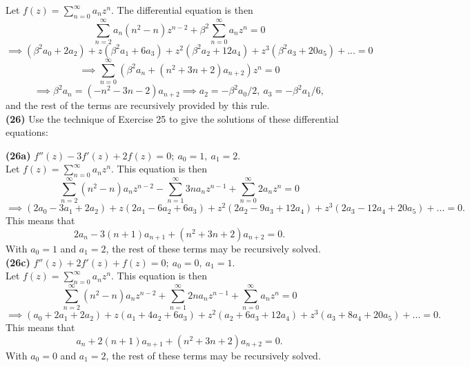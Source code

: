 \documentclass[12pt,letterpaper]{article}
\begin{document}
Let \(f(z) = \sum_{n=0}^{\infty} a_{n}z^{n}\). The differential equation is then \[\sum_{n=2}^{\infty} a_{n}(n^{2} -n)z^{n-2} +\beta^{2}\sum_{n=0}^{\infty} a_{n}z^{n} = 0\] \[\implies (\beta^{2}a_{0} + 2a_{2}) + z(\beta^{2}a_{1} + 6a_{3}) + z^{2}(\beta^{2}a_{2} + 12a_{4}) + z^{3}(\beta^{2}a_{3} + 20a_{5}) + ... = 0 \] \[\implies \sum_{n = 0}^{\infty} (\beta^{2}a_{n} + (n^{2} + 3n + 2)a_{n+2})z^{n} = 0\] \[\implies \beta^{2}a_{n} = (-n^{2} - 3n - 2)a_{n+2} \implies a_{2} = -\beta^{2}a_{0}/2,\ a_{3} = -\beta^{2}a_{1}/6,\] and the rest of the terms are recursively provided by this rule. \\

\textbf{(26)} Use the technique of Exercise 25 to give the solutions of these differential equations:

\textbf{(26a)} \(f''(z) -3f'(z) +2f(z) = 0;\ a_{0} = 1,\ a_{1} = 2.\) \\

Let \(f(z) = \sum_{n=0}^{\infty} a_{n}z^{n}\). This equation is then \[\sum_{n=2}^{\infty} (n^{2}-n)a_{n}z^{n-2} - \sum_{n=1}^{\infty} 3na_{n}z^{n-1} + \sum_{n=0}^{\infty}2a_{n}z^{n} = 0\] \[\implies (2a_{0}-3a_{1}+2a_{2})+z(2a_{1} -6a_{2} + 6a_{3})+z^{2}(2a_{2} - 9a_{3} + 12a_{4})+z^{3}(2a_{3} - 12a_{4} + 20a_{5}) + ... = 0.\] This means that \[2a_{n} - 3(n+1)a_{n+1} + (n^{2} + 3n + 2)a_{n+2} = 0.\] With \(a_{0} = 1\) and \(a_{1} = 2\), the rest of these terms may be recursively solved. \\

\textbf{(26c)} \(f''(z) + 2f'(z) + f(z) = 0;\ a_{0} = 0,\ a_{1} = 1.\) \\

Let \(f(z) = \sum_{n=0}^{\infty} a_{n}z^{n}\). This equation is then \[\sum_{n=2}^{\infty} (n^{2}-n)a_{n}z^{n-2} + \sum_{n=1}^{\infty} 2na_{n}z^{n-1} + \sum_{n=0}^{\infty}a_{n}z^{n} = 0\] \[\implies (a_{0}+2a_{1}+2a_{2})+z(a_{1} +4a_{2} + 6a_{3})+z^{2}(a_{2} +6a_{3} + 12a_{4})+z^{3}(a_{3} +8a_{4} + 20a_{5}) + ... = 0.\] This means that \[a_{n} + 2(n+1)a_{n+1} + (n^{2} + 3n + 2)a_{n+2} = 0.\] With \(a_{0} = 0\) and \(a_{1} = 2\), the rest of these terms may be recursively solved. \\

 
\end{document}

